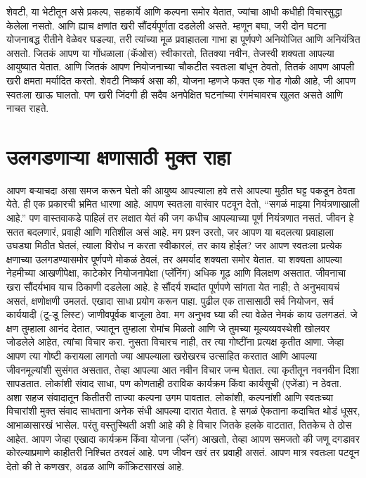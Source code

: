 शेवटी, या भेटीतून असे प्रकल्प, सहकार्ये आणि कल्पना समोर येतात, ज्यांचा आधी कधीही विचारसुद्धा केलेला नसतो. आणि ह्याच क्षणांत खरी सौंदर्यपूर्णता दडलेली असते.
म्हणून बघा, जरी दोन घटना योजनाबद्ध रीतीने वेळेवर घडल्या, तरी त्यांच्या मूळ प्रवाहातला गाभा हा पूर्णपणे अनियोजित आणि अनियंत्रित असतो. जितकं आपण या गोंधळाला (कॅओस) स्वीकारतो, तितक्या नवीन, तेजस्वी शक्यता आपल्या आयुष्यात येतात. आणि जितकं आपण नियोजनाच्या चौकटीत स्वतःला बांधून ठेवतो, तितकं आपण आपली खरी क्षमता मर्यादित करतो.
शेवटी निष्कर्ष असा की, योजना म्हणजे फक्त एक गोड गोळी आहे, जी आपण स्वतःला खाऊ घालतो. पण खरी जिंदगी ही सदैव अनपेक्षित घटनांच्या रंगमंचावरच खुलत असते आणि नाचत राहते.
 \chapter{उलगडणाऱ्या क्षणासाठी मुक्त राहा}
आपण बर्‍याचदा असा समज करून घेतो की आयुष्य आपल्याला हवे तसे आपल्या मुठीत घट्ट पकडून ठेवता येते. ही एक प्रकारची भ्रमित धारणा आहे. आपण स्वतःला वारंवार पटवून देतो,  “सगळं माझ्या नियंत्रणाखाली आहे.” पण वास्तवाकडे पाहिलं तर लक्षात येतं की जग कधीच आपल्याच्या पूर्ण नियंत्रणात नसतं. जीवन हे सतत बदलणारं, प्रवाही आणि गतिशील असं आहे. मग प्रश्न उरतो,  जर आपण या बदलत्या प्रवाहाला उघड्या मिठीत घेतलं, त्याला विरोध न करता स्वीकारलं, तर काय होईल?
जर आपण स्वतःला प्रत्येक क्षणाच्या उलगडण्यासमोर पूर्णपणे मोकळं ठेवलं, तर अमर्याद शक्यता समोर येतात. या शक्यता आपल्या नेहमीच्या आखणीपेक्षा, काटेकोर नियोजनापेक्षा (प्लॅनिंग) अधिक गूढ आणि विलक्षण असतात. जीवनाचा खरा सौंदर्यभाव याच ठिकाणी दडलेला आहे. हे सौंदर्य शब्दांत पूर्णपणे सांगता येत नाही; ते अनुभवायचं असतं, क्षणोक्षणी उमलतं.
एखादा साधा प्रयोग करून पाहा. पुढील एक तासासाठी सर्व नियोजन, सर्व कार्ययादी (टू-डू लिस्ट) जाणीवपूर्वक बाजूला ठेवा. मग अनुभव घ्या की त्या वेळेत नेमकं काय उलगडतं. जे क्षण तुम्हाला आनंद देतात, ज्यातून तुम्हाला रोमांच मिळतो आणि जे तुमच्या मूल्यव्यवस्थेशी खोलवर जोडलेले आहेत, त्यांचा विचार करा. नुसता विचारच नाही, तर त्या गोष्टींना प्रत्यक्ष कृतीत आणा.
जेव्हा आपण त्या गोष्टी करायला लागतो ज्या आपल्याला खरोखरच उत्साहित करतात आणि आपल्या जीवनमूल्यांशी सुसंगत असतात, तेव्हा आपल्या आत नवीन विचार जन्म घेतात. त्या कृतीतून नवनवीन दिशा सापडतात. लोकांशी संवाद साधा, पण कोणताही ठराविक कार्यक्रम किंवा कार्यसूची (एजेंडा) न ठेवता. अशा सहज संवादातून कितीतरी ताज्या कल्पना उगम पावतात. लोकांशी, कल्पनांशी आणि स्वतःच्या विचारांशी मुक्त संवाद साधताना अनेक संधी आपल्या दारात येतात.
हे सगळं ऐकताना कदाचित थोडं धूसर, आभाळासारखं भासेल. परंतु वस्तुस्थिती अशी आहे की हे विचार जितके हलके वाटतात, तितकेच ते ठोस आहेत. आपण जेव्हा एखादा कार्यक्रम किंवा योजना (प्लॅन) आखतो, तेव्हा आपण समजतो की जणू दगडावर कोरल्याप्रमाणे काहीतरी निश्चित ठरवलं आहे. पण जीवन खरं तर प्रवाही असतं. आपण मात्र स्वतःला पटवून देतो की ते कणखर, अढळ आणि कॉंक्रिटसारखं आहे.
